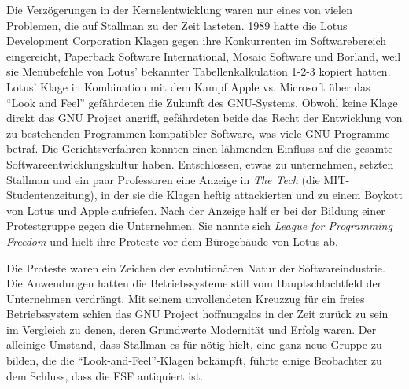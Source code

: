Die Verzögerungen in der Kernelentwicklung waren nur eines von vielen Problemen, die auf Stallman zu der Zeit lasteten. 1989 hatte die Lotus Development Corporation Klagen gegen ihre Konkurrenten im Softwarebereich eingereicht, Paperback Software International, Mosaic Software und Borland, weil sie Menübefehle von Lotus' bekannter Tabellenkalkulation 1-2-3 kopiert hatten. Lotus' Klage in Kombination mit dem Kampf Apple vs. Microsoft über das "`Look and Feel"' gefährdeten die Zukunft des GNU-Systems. Obwohl keine Klage direkt das GNU Project angriff, gefährdeten beide das Recht der Entwicklung von zu bestehenden Programmen kompatibler Software, was viele GNU-Programme betraf. Die Gerichtsverfahren konnten einen lähmenden Einfluss auf die gesamte Softwareentwicklungskultur haben. Entschlossen, etwas zu unternehmen, setzten Stallman und ein paar Professoren eine Anzeige in \textit{The Tech} (die MIT-Studentenzeitung), in der sie die Klagen heftig attackierten und zu einem Boykott von Lotus und Apple aufriefen. Nach der Anzeige half er bei der Bildung einer Protestgruppe gegen die Unternehmen. Sie nannte sich \textit{League for Programming Freedom} und hielt ihre Proteste vor dem Bürogebäude von Lotus ab.

Die Proteste waren ein Zeichen der evolutionären Natur der Softwareindustrie. Die Anwendungen hatten die Betriebssysteme still vom Hauptschlachtfeld der Unternehmen verdrängt. Mit seinem unvollendeten Kreuzzug für ein freies Betriebssystem schien das GNU Project hoffnungslos in der Zeit zurück zu sein im Vergleich zu denen, deren Grundwerte Modernität und Erfolg waren. Der alleinige Umstand, dass Stallman es für nötig hielt, eine ganz neue Gruppe zu bilden, die die "`Look-and-Feel"'-Klagen bekämpft, führte einige Beobachter zu dem Schluss, dass die FSF antiquiert ist.

